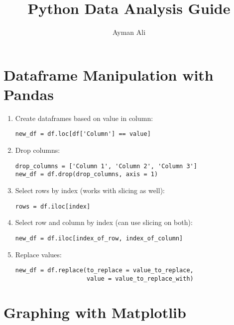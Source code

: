 \documentclass{article}
\begin{document}
\title{%
    Python Data Analysis Guide \\
}
\author{Ayman Ali}
\date{}
\maketitle

\clearpage

\tableofcontents
\listoffigures
\listoftables

\clearpage

\section{Dataframe Manipulation with Pandas}
\begin{enumerate}
    \item Create dataframes based on value in column:
    \begin{verbatim}
new_df = df.loc[df['Column'] == value]
    \end{verbatim}
    \item Drop columns:
    \begin{verbatim}
drop_columns = ['Column 1', 'Column 2', 'Column 3']
new_df = df.drop(drop_columns, axis = 1)
    \end{verbatim}
    \item Select rows by index (works with slicing as well):
    \begin{verbatim}
rows = df.iloc[index]
    \end{verbatim}
    \item Select row and column by index (can use slicing on both):
    \begin{verbatim}
new_df = df.iloc[index_of_row, index_of_column]
    \end{verbatim}
    \item Replace values:
    \begin{verbatim}
new_df = df.replace(to_replace = value_to_replace,
                    value = value_to_replace_with)
    \end{verbatim}
\end{enumerate}

\section{Graphing with Matplotlib}
\end{document}

